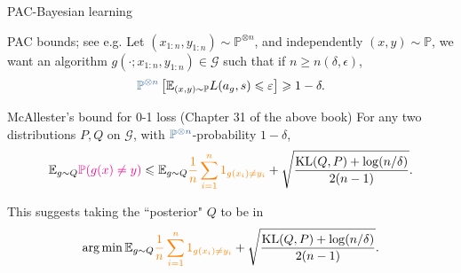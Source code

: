 \documentclass[10pt]{beamer}
\begin{document}
\begin{frame}{PAC-Bayesian learning}
\begin{block}{PAC bounds; see e.g. \citep{ShBe14}}
Let $(x_{1:n},y_{1:n})\sim \mathbb{P}^{\otimes n}$, and independently $(x,y)\sim \mathbb{P}$, we want an algorithm $g(\cdot; x_{1:n}, y_{1:n})\in\mathcal G$ such that if $n\geq n(\delta,\epsilon)$,
$$
\unn{\mathbb{P}^{\otimes n}}\left[\mathbb{E}_{(x,y)\sim \mathbb P} L(a_g,s) \leq \epsilon\right] \geq 1-\delta.
$$
\end{block}
\begin{block}{McAllester's bound for 0-1 loss (Chapter 31 of the above book)}
For any two distributions $P,Q$ on $\mathcal G$, with $\unn{\mathbb{P}^{\otimes n}}$-probability $1-\delta$,
$$
\mathbb E_{g\sim Q} \textcolor{magenta}{\mathbb{P} (g(x)\neq y)} \leqslant \mathbb{E}_{g\sim Q} \textcolor{orange}{\frac1n\sum_{i=1}^n 1_{g(x_i)\neq y_i}} + \sqrt{\frac{\text{KL}(Q,P) + \log(n/\delta)}{2(n-1)}}.
$$
\end{block}

This suggests taking the ``posterior" $Q$ to be in
$$
\operatorname*{arg\,min} \mathbb{E}_{g\sim Q} \textcolor{orange}{\frac1n\sum_{i=1}^n 1_{g(x_i)\neq y_i}} + \sqrt{\frac{\text{KL}(Q,P) + \log(n/\delta)}{2(n-1)}}.
$$
\end{frame}
\end{document}
